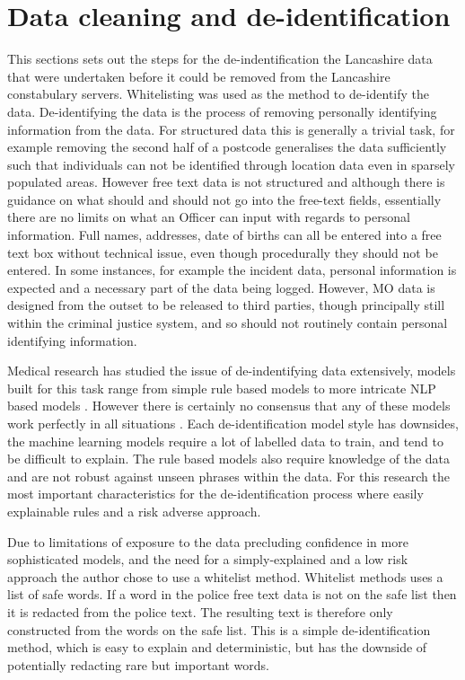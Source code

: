 \section{Data cleaning and de-identification} This sections sets out the steps for the de-indentification the Lancashire data that were undertaken before it could be removed from the Lancashire constabulary servers. Whitelisting was used as the method to de-identify the data. De-identifying the data is the process of removing personally identifying information from the data. For structured data this is generally a trivial task, for example removing the second half of a postcode generalises the data sufficiently such that individuals can not be identified through location data even in sparsely populated areas. However free text data is not structured and although there is guidance on what should and should not go into the free-text fields, essentially there are no limits on what an Officer can input with regards to personal information. Full names, addresses, date of births can all be entered into a free text box without technical issue, even though procedurally they should not be entered. In some instances, for example the incident data, personal information is expected and a necessary part of the data being logged. However, MO data is designed from the outset to be released to third parties, though principally still within the criminal justice system, and so should not routinely contain personal identifying information.

Medical research has studied the issue of de-indentifying data extensively, models built for this task range from simple rule based models to more intricate NLP based models \parencite{meystre2010automatic}. However there is certainly no consensus that any of these models work perfectly in all situations \parencite{narayanan2014no}. Each de-identification model style has downsides, the machine learning models require a lot of labelled data to train, and tend to be difficult to explain. The rule based models also require knowledge of the data and are not robust against unseen phrases within the data. For this research the most important characteristics for the de-identification process where easily explainable rules and a risk adverse approach.

Due to limitations of exposure to the data precluding confidence in more sophisticated models, and the need for a simply-explained and a low risk approach the author chose to use a whitelist method. Whitelist methods uses a list of safe words. If a word in the police free text data is not on the safe list then it is redacted from the police text. The resulting text is therefore only constructed from the words on the safe list. This is a simple de-identification method, which is easy to explain and deterministic, but has the downside of potentially redacting rare but important words. 

